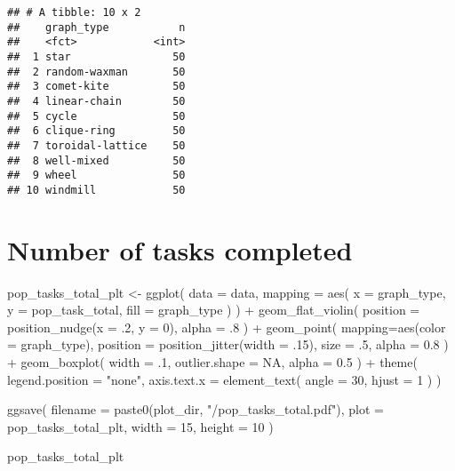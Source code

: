 \documentclass[
]{book}
\newenvironment{Shaded}{\begin{snugshade}}{\end{snugshade}}
\newcommand{\AttributeTok}[1]{\textcolor[rgb]{0.77,0.63,0.00}{#1}}
\newcommand{\ConstantTok}[1]{\textcolor[rgb]{0.00,0.00,0.00}{#1}}
\newcommand{\DecValTok}[1]{\textcolor[rgb]{0.00,0.00,0.81}{#1}}
\newcommand{\FloatTok}[1]{\textcolor[rgb]{0.00,0.00,0.81}{#1}}
\newcommand{\FunctionTok}[1]{\textcolor[rgb]{0.00,0.00,0.00}{#1}}
\newcommand{\NormalTok}[1]{#1}
\newcommand{\OtherTok}[1]{\textcolor[rgb]{0.56,0.35,0.01}{#1}}
\newcommand{\SpecialCharTok}[1]{\textcolor[rgb]{0.00,0.00,0.00}{#1}}
\newcommand{\StringTok}[1]{\textcolor[rgb]{0.31,0.60,0.02}{#1}}
\begin{document}
\begin{verbatim}
## # A tibble: 10 x 2
##    graph_type           n
##    <fct>            <int>
##  1 star                50
##  2 random-waxman       50
##  3 comet-kite          50
##  4 linear-chain        50
##  5 cycle               50
##  6 clique-ring         50
##  7 toroidal-lattice    50
##  8 well-mixed          50
##  9 wheel               50
## 10 windmill            50
\end{verbatim}

\hypertarget{number-of-tasks-completed}{%
\section{Number of tasks completed}\label{number-of-tasks-completed}}

\begin{Shaded}
\begin{Highlighting}[]
\NormalTok{pop\_tasks\_total\_plt }\OtherTok{\textless{}{-}} \FunctionTok{ggplot}\NormalTok{(}
  \AttributeTok{data =}\NormalTok{ data,}
  \AttributeTok{mapping =} \FunctionTok{aes}\NormalTok{(}
    \AttributeTok{x =}\NormalTok{ graph\_type,}
    \AttributeTok{y =}\NormalTok{ pop\_task\_total,}
    \AttributeTok{fill =}\NormalTok{ graph\_type}
\NormalTok{  )}
\NormalTok{) }\SpecialCharTok{+}
  \FunctionTok{geom\_flat\_violin}\NormalTok{(}
    \AttributeTok{position =} \FunctionTok{position\_nudge}\NormalTok{(}\AttributeTok{x =}\NormalTok{ .}\DecValTok{2}\NormalTok{, }\AttributeTok{y =} \DecValTok{0}\NormalTok{),}
    \AttributeTok{alpha =}\NormalTok{ .}\DecValTok{8}
\NormalTok{  ) }\SpecialCharTok{+}
  \FunctionTok{geom\_point}\NormalTok{(}
    \AttributeTok{mapping=}\FunctionTok{aes}\NormalTok{(}\AttributeTok{color =}\NormalTok{ graph\_type),}
    \AttributeTok{position =} \FunctionTok{position\_jitter}\NormalTok{(}\AttributeTok{width =}\NormalTok{ .}\DecValTok{15}\NormalTok{),}
    \AttributeTok{size =}\NormalTok{ .}\DecValTok{5}\NormalTok{,}
    \AttributeTok{alpha =} \FloatTok{0.8}
\NormalTok{  ) }\SpecialCharTok{+}
  \FunctionTok{geom\_boxplot}\NormalTok{(}
    \AttributeTok{width =}\NormalTok{ .}\DecValTok{1}\NormalTok{,}
    \AttributeTok{outlier.shape =} \ConstantTok{NA}\NormalTok{,}
    \AttributeTok{alpha =} \FloatTok{0.5}
\NormalTok{  ) }\SpecialCharTok{+}
  \FunctionTok{theme}\NormalTok{(}
    \AttributeTok{legend.position =} \StringTok{"none"}\NormalTok{,}
    \AttributeTok{axis.text.x =} \FunctionTok{element\_text}\NormalTok{(}
      \AttributeTok{angle =} \DecValTok{30}\NormalTok{,}
      \AttributeTok{hjust =} \DecValTok{1}
\NormalTok{    )}
\NormalTok{  )}

\FunctionTok{ggsave}\NormalTok{(}
  \AttributeTok{filename =} \FunctionTok{paste0}\NormalTok{(plot\_dir, }\StringTok{"/pop\_tasks\_total.pdf"}\NormalTok{),}
  \AttributeTok{plot =}\NormalTok{ pop\_tasks\_total\_plt,}
  \AttributeTok{width =} \DecValTok{15}\NormalTok{,}
  \AttributeTok{height =} \DecValTok{10}
\NormalTok{)}

\NormalTok{pop\_tasks\_total\_plt}
\end{Highlighting}
\end{Shaded}
\end{document}
